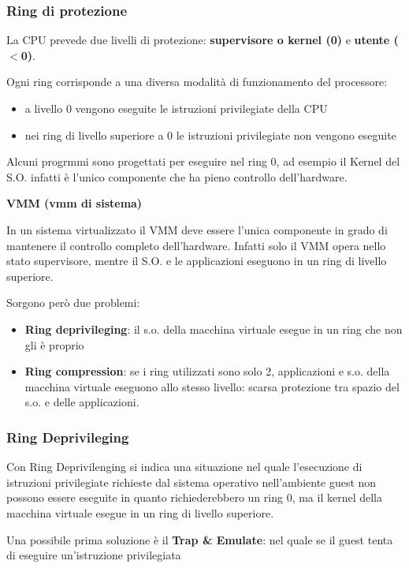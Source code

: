 \documentclass{article}
\begin{document}
\subsubsection{Ring di protezione}

La CPU prevede due livelli di protezione: \textbf{supervisore o kernel (0)} e \textbf{utente ($<$0)}.

Ogni ring corrisponde a una diversa modalità di funzionamento del processore:
\begin{itemize}
    \item a livello 0 vengono eseguite le istruzioni privilegiate della CPU
    \item nei ring di livello superiore a 0 le istruzioni privilegiate non vengono eseguite
\end{itemize}

Alcuni progrmmi sono progettati per eseguire nel ring 0, ad esempio il Kernel del S.O. infatti è l'unico componente che ha pieno controllo dell'hardware.

\vspace{3mm}
\textbf{VMM (vmm di sistema)}

In un sistema virtualizzato il VMM deve essere l'unica componente in grado di mantenere il controllo completo dell'hardware. Infatti solo il VMM opera nello stato supervisore, 
mentre il S.O. e le applicazioni eseguono in un ring di livello superiore.

Sorgono però due problemi:
\begin{itemize}
    \item \textbf{Ring deprivileging}: il s.o. della macchina virtuale esegue in un ring che non gli è proprio
    \item \textbf{Ring compression}: se i ring utilizzati sono solo 2, applicazioni e s.o. della macchina virtuale eseguono allo stesso livello: 
    scarsa protezione tra spazio del s.o. e delle applicazioni.
\end{itemize}

\subsubsection{Ring Deprivileging}
Con Ring Deprivilenging si indica una situazione nel quale l'esecuzione di istruzioni privilegiate richieste dal sistema operativo nell'ambiente guest non
possono essere eseguite in quanto richiederebbero un ring 0, ma il kernel della macchina virtuale esegue in un ring di livello superiore.

Una possibile prima soluzione è il \textbf{Trap \& Emulate}: nel quale se il guest tenta di eseguire un'istruzione privilegiata
\end{document}

